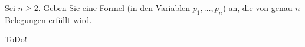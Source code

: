 
\begin{exercise}[22]

Sei $n \geq 2$.
Geben Sie eine Formel (in den Variablen $p_1, \ldots, p_n$) an, die von genau $n$ Belegungen erfüllt wird.

\end{exercise}


\begin{solution}

ToDo!

\end{solution}

